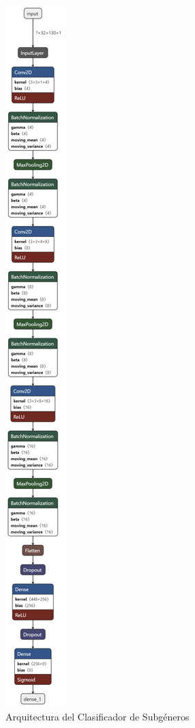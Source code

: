 \begin{figure}
    \centering
    \includegraphics[width=\textwidth,height=\textheight,keepaspectratio]{img/C/cnn_sub.png}
    \caption{Arquitectura del Clasificador de Subgéneros}
    \label{fig:C:cnn_subgéneros}
\end{figure}


